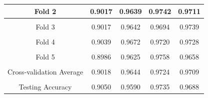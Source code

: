 \documentclass[11pt]{article}
\begin{document}
\begin{enumerate}[-]
\begin{table}[htbp]
\begin{tabular}{|c|c|c|c|c|}
		Fold 2& 0.9017 &0.9639 &0.9742 &0.9711 \\
		\hline
		& & & &\\[-8pt] 
		Fold 3& 0.9017 &0.9642 &0.9694 &0.9739  \\
		\hline
		& & & &\\[-8pt] 
		Fold 4& 0.9039&0.9672 &0.9720 &0.9728  \\
		\hline
		& & & &\\[-8pt] 
		Fold 5& 0.8986 &0.9625 &0.9758 &0.9658  \\
		\hline
		& & & &\\[-8pt] 
		Cross-validation Average&0.9018 &0.9644 &0.9724 &0.9709  \\
		\hline
		& & & &\\[-8pt] 
		Testing Accuracy&0.9050 &0.9590 &0.9735 &0.9688  \\
		\hline
	\end{tabular}
\end{table}
\end{enumerate}
\end{document}
